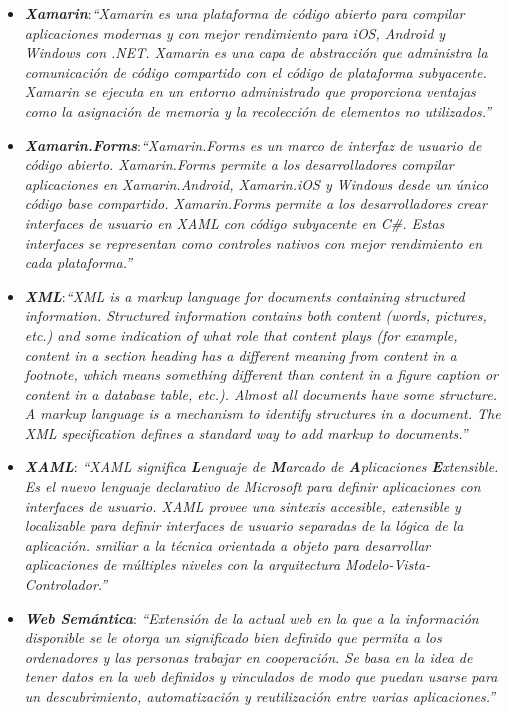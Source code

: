 \begin{itemize}
    \item \textbf{\textit{Xamarin}}:\textit{“Xamarin es una plataforma de código abierto para compilar aplicaciones modernas 
    y con mejor rendimiento para iOS, Android y Windows con .NET. Xamarin es una capa de abstracción que administra la 
    comunicación de código compartido con el código de plataforma subyacente. Xamarin se ejecuta en un entorno administrado 
    que proporciona ventajas como la asignación de memoria y la recolección de elementos no utilizados.”} \autocite*{Xamarin}
    
    \item \textbf{\textit{Xamarin.Forms}}:\textit{“Xamarin.Forms es un marco de interfaz de usuario de código abierto. 
    Xamarin.Forms permite a los desarrolladores compilar aplicaciones en Xamarin.Android, Xamarin.iOS y Windows desde 
    un único código base compartido. Xamarin.Forms permite a los desarrolladores crear interfaces de usuario en XAML 
    con código subyacente en C\#. Estas interfaces se representan como controles nativos con mejor rendimiento en cada plataforma.”}
    \autocite*{XamForms}
    
    \item \textbf{\textit{XML}}:\textit{“XML is a markup language for documents containing structured information. 
    Structured information contains both content (words, pictures, etc.) and some indication of what role that content 
    plays (for example, content in a section heading has a different meaning from content in a footnote, which means something
    different than content in a figure caption or content in a database table, etc.). Almost all documents have some structure.
    A markup language is a mechanism to identify structures in a document. The XML specification defines a standard way to add 
    markup to documents.”} \autocite*{Walsh}

    \item \textbf{\textit{XAML}}: \textit{“XAML significa \textbf{L}enguaje de \textbf{M}arcado de \textbf{A}plicaciones 
    \textbf{E}xtensible. Es el nuevo lenguaje declarativo de Microsoft para definir aplicaciones con interfaces de usuario.
    XAML provee una sintexis accesible, extensible y localizable para definir interfaces de usuario separadas de la lógica de 
    la aplicación. smiliar a la técnica orientada a objeto para desarrollar aplicaciones de múltiples niveles con la arquitectura 
    Modelo-Vista-Controlador.”} \autocite*{MacVittieA.2006}
    
    \item \textbf{\textit{Web Semántica}}: \textit{“Extensión de la actual 
    web en la que a la información disponible se le otorga un significado 
    bien definido que permita a los ordenadores y las personas trabajar en 
    cooperación. Se basa en la idea de tener datos en la web definidos y 
    vinculados de modo que puedan usarse para un descubrimiento, 
    automatización y reutilización entre varias aplicaciones.”} \autocite*{Hendler2002}

\end{itemize}

